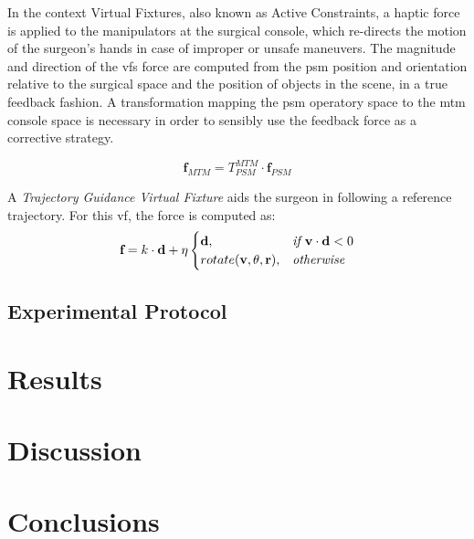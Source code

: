 \documentclass{article}
\begin{document}
\begin{multicols}{2}
In the context Virtual Fixtures, also known as Active Constraints, a haptic force is applied to the manipulators at the surgical console, which re-directs the motion of the surgeon's hands in case of improper or unsafe maneuvers. The magnitude and direction of the \acp{vf} force are computed from the \ac{psm} position and orientation relative to the surgical space and the position of objects in the scene, in a true feedback fashion. A transformation mapping the \ac{psm} operatory space to the \ac{mtm} console space is necessary in order to sensibly use the feedback force as a corrective strategy.

\begin{equation}
  \textbf{f}_{MTM} = T_{PSM}^{MTM}\cdot \textbf{f}_{PSM}
\end{equation}

A \textit{Trajectory Guidance Virtual Fixture} aids the surgeon in following a reference trajectory. For this \ac{vf}, the force is computed as:
\begin{equation}
  \textbf{f} = k \cdot \textbf{d} + \eta 
  \begin{cases} 
    $$
    \textbf{d}, & \textit{if         } \textbf{v}\cdot\textbf{d}<0 \\
     rotate(\textbf{v},\theta,\textbf{r}), & \textit{otherwise}
    $$
  \end{cases}
\end{equation}

\subsection{Experimental Protocol}

\section{Results}
\section{Discussion}
\section{Conclusions}


\end{multicols}
\end{document}

